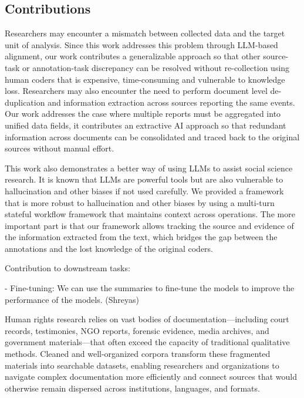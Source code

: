 \documentclass{article}
\begin{document}
\subsection{Contributions}\label{contributions}

Researchers may encounter a mismatch between collected data and the
target unit of analysis. Since this work addresses this problem through
LLM-based alignment, our work contributes a generalizable approach so
that other source-task or annotation-task discrepancy can be resolved
without re-collection using human coders that is expensive,
time-consuming and vulnerable to knowledge loss. Researchers may also
encounter the need to perform document level de-duplication and
information extraction across sources reporting the same events. Our
work addresses the case where multiple reports must be aggregated into
unified data fields, it contributes an extractive AI approach so that
redundant information across documents can be consolidated and traced
back to the original sources without manual effort.

This work also demonstrates a better way of using LLMs to assist social
science research. It is known that LLMs are powerful tools but are also
vulnerable to hallucination and other biases if not used carefully. We
provided a framework that is more robust to hallucination and other
biases by using a multi-turn stateful workflow framework that maintains
context across operations. The more important part is that our framework
allows tracking the source and evidence of the information extracted
from the text, which bridges the gap between the annotations and the
lost knowledge of the original coders.

\medskip

Contribution to downstream tasks: 

- Fine-tuning: We can use the
summaries to fine-tune the models to improve the performance of the
models. (Shreyas)

\medskip

Human rights research relies on vast bodies of documentation—including court records, testimonies, NGO reports, forensic evidence, media archives, and government materials—that often exceed the capacity of traditional qualitative methods. Cleaned and well-organized corpora transform these fragmented materials into searchable datasets, enabling researchers and organizations to navigate complex documentation more efficiently and connect sources that would otherwise remain dispersed across institutions, languages, and formats.
\end{document}
